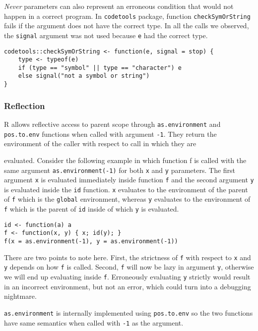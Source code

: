\documentclass[review,nonacm,screen,acmsmall,anonymous=true]{acmart}
\newcommand{\never}{\emph{Never}\xspace}
\newcommand{\code}[1]{\lstinline[style=R]|#1|\xspace}
\begin{document}
\never parameters can also represent an erroneous condition that would not
happen in a correct program. In \code{codetools} package, function
\code{checkSymOrString} fails if the argument does not have the correct type. In
all the calls we observed, the \code{signal} argument was not used because
\code{e} had the correct type.
\begin{lstlisting}
codetools::checkSymOrString <- function(e, signal = stop) {
    type <- typeof(e)
    if (type == "symbol" || type == "character") e
    else signal("not a symbol or string")
}
\end{lstlisting}

\subsubsection{Reflection}

R allows reflective access to parent scope through \code{as.environment} and
\code{pos.to.env} functions when called with argument \code{-1}.
They return the environment of the caller with respect to call in which they are

evaluated. Consider the following example in which function f is called with the
same argument \code{as.environment(-1)} for both \code{x} and \code{y}
parameters. The first argument \code{x} is evaluated immediately inside
function \code{f} and the second argument \code{y} is evaluated inside the
\code{id} function. \code{x} evaluates to the environment of the parent of
\code{f} which is the \code{global} environment, whereas \code{y} evaluates to
the environment of \code{f} which is the parent of \code{id} inside of which
\code{y} is evaluated.

\begin{lstlisting}
id <- function(a) a
f <- function(x, y) { x; id(y); }
f(x = as.environment(-1), y = as.environment(-1))
\end{lstlisting}

There are two points to note here. First, the strictness of \code{f} with
respect to \code{x} and \code{y} depends on how \code{f} is called. Second,
\code{f} will now be lazy in argument \code{y}, otherwise we will end up
evaluating inside \code{f}. Erroneously evaluating \code{y} strictly would
result in an incorrect environment, but not an error, which could turn into a
debugging nightmare.

\code{as.environment} is internally implemented using \code{pos.to.env} so the
two functions have same semantics when called with \code{-1} as the argument.
\end{document}
